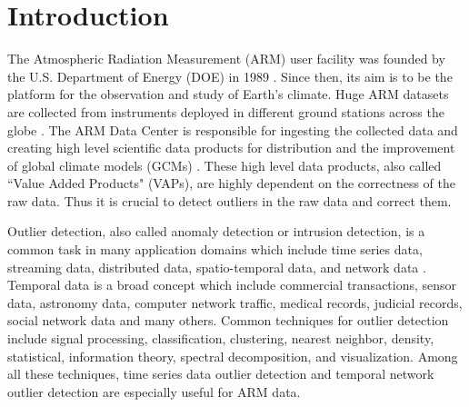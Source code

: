 \section{Introduction}
The Atmospheric Radiation Measurement (ARM) user facility was founded by the U.S. Department of Energy (DOE) in 1989 \cite{ARM}. Since then, its aim is to be the platform for the observation and study of Earth's climate. Huge ARM datasets are collected from instruments deployed in different ground stations across the globe \cite{stokes1994atmospheric}. The ARM Data Center is responsible for ingesting the collected data and creating high level scientific data products for distribution and the improvement of global climate models (GCMs) \cite{gaustad2014scientific}. These high level data products, also called ``Value Added Products" (VAPs), are highly dependent on the correctness of the raw data. Thus it is crucial to detect outliers in the raw data and correct them.

Outlier detection, also called anomaly detection or intrusion detection, is a common task in many application domains which include time series data, streaming data, distributed data, spatio-temporal data, and network data \cite{gupta2014outlier}. Temporal data is a broad concept which include commercial transactions, sensor data, astronomy data, computer network traffic, medical records, judicial records, social network data and many others. Common techniques for outlier detection include signal processing, classification, clustering, nearest neighbor, density, statistical, information theory, spectral decomposition, and visualization. Among all these techniques, time series data outlier detection and temporal network outlier detection are especially useful for ARM data.

